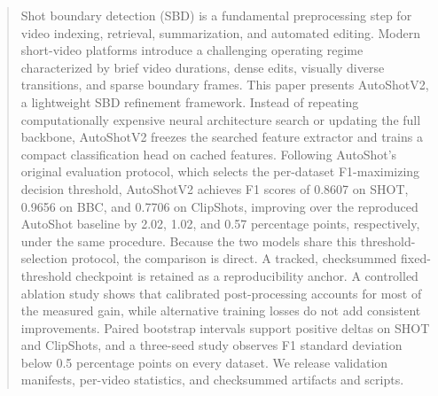 \begin{abstract}
Shot boundary detection (SBD) is a fundamental preprocessing step for video
indexing, retrieval, summarization, and automated editing. Modern short-video
platforms introduce a challenging operating regime characterized by brief video
durations, dense edits, visually diverse transitions, and sparse boundary frames.
This paper presents AutoShotV2, a lightweight SBD refinement framework. Instead
of repeating computationally expensive neural architecture search or updating the
full backbone, AutoShotV2 freezes the searched feature extractor and trains a compact
classification head on cached features.
Following AutoShot's original evaluation protocol, which selects the
per-dataset F1-maximizing decision threshold, AutoShotV2 achieves F1 scores of
0.8607 on SHOT, 0.9656 on BBC, and 0.7706 on ClipShots, improving over the
reproduced AutoShot baseline by 2.02, 1.02, and 0.57 percentage points,
respectively, under the same procedure. Because the two models share this
threshold-selection protocol, the comparison is direct. A tracked, checksummed
fixed-threshold checkpoint is retained as a reproducibility anchor.
A controlled ablation study shows that calibrated post-processing
accounts for most of the measured gain, while alternative training losses do not
add consistent improvements. Paired bootstrap intervals support positive deltas
on SHOT and ClipShots, and a three-seed study observes F1 standard deviation
below 0.5 percentage points on every dataset. We release validation manifests,
per-video statistics, and checksummed artifacts and scripts.
\end{abstract}

